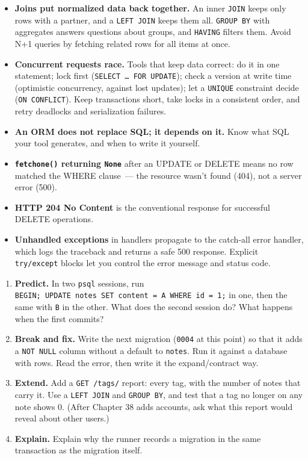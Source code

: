 \begin{takeaways}
\begin{itemize}
\item
  \textbf{Joins put normalized data back together.} An inner \texttt{JOIN} keeps only rows with a partner, and a \texttt{LEFT\ JOIN} keeps them all. \texttt{GROUP\ BY} with aggregates answers questions about groups, and \texttt{HAVING} filters them. Avoid N+1 queries by fetching related rows for all items at once.
\item
  \textbf{Concurrent requests race.} Tools that keep data correct: do it in one statement; lock first (\texttt{SELECT\ …\ FOR\ UPDATE}); check a version at write time (optimistic concurrency, against lost updates); let a \texttt{UNIQUE} constraint decide (\texttt{ON\ CONFLICT}). Keep transactions short, take locks in a consistent order, and retry deadlocks and serialization failures.
\item
  \textbf{An ORM does not replace SQL; it depends on it.} Know what SQL your tool generates, and when to write it yourself.
\item
  \textbf{\texttt{fetchone()} returning \texttt{None}} after an UPDATE or DELETE means no row matched the WHERE clause~--- the resource wasn't found (404), not a server error (500).
\item
  \textbf{HTTP 204 No Content} is the conventional response for successful DELETE operations.
\item
  \textbf{Unhandled exceptions} in handlers propagate to the catch-all error handler, which logs the traceback and returns a safe 500 response. Explicit \texttt{try/except} blocks let you control the error message and status code.
\end{itemize}

\end{takeaways}

\label{33-logic-execution:exercises}

\begin{enumerate}
\def\labelenumi{\arabic{enumi}.}
\tightlist
\item
  \textbf{Predict.} In two \texttt{psql} sessions, run \texttt{BEGIN;\ UPDATE\ notes\ SET\ content\ =}\allowbreak{}\texttt{\ \textquotesingle{}A\textquotesingle{}\ WHERE\ id\ =}\allowbreak{}\texttt{\ 1;} in one, then the same with \texttt{\textquotesingle{}B\textquotesingle{}} in the other. What does the second session do? What happens when the first commits?
\item
  \textbf{Break and fix.} Write the next migration (\texttt{0004} at this point) so that it adds a \texttt{NOT\ NULL} column without a default to \texttt{notes}. Run it against a database with rows. Read the error, then write it the expand/contract way.
\item
  \textbf{Extend.} Add a \texttt{GET\ /tags/} report: every tag, with the number of notes that carry it. Use a \texttt{LEFT\ JOIN} and \texttt{GROUP\ BY}, and test that a tag no longer on any note shows 0. (After Chapter 38 adds accounts, ask what this report would reveal about other users.)
\item
  \textbf{Explain.} Explain why the runner records a migration in the same transaction as the migration itself.
\end{enumerate}

